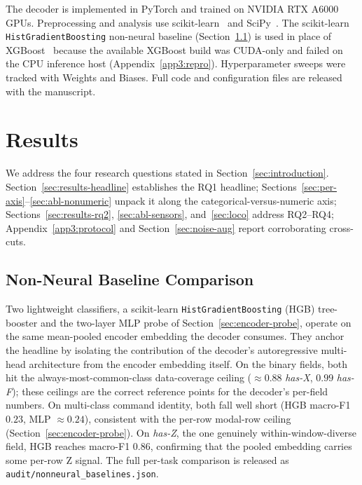\documentclass[sensors,article,submit,moreauthors,pdftex]{Definitions/mdpi}
\begin{document}
The decoder is implemented in PyTorch and trained on NVIDIA RTX A6000 GPUs. Preprocessing and analysis use scikit-learn~\cite{pedregosa2011sklearn} and SciPy~\cite{virtanen2020scipy}. The scikit-learn \texttt{HistGradientBoosting} non-neural baseline (Section~\ref{sec:results-baseline}) is used in place of XGBoost~\cite{chen2016xgboost} because the available XGBoost build was CUDA-only and failed on the CPU inference host (Appendix~\ref{app3:repro}). Hyperparameter sweeps were tracked with Weights and Biases. Full code and configuration files are released with the manuscript.

\section{Results}
\label{sec:experiments}

We address the four research questions stated in Section~\ref{sec:introduction}. Section~\ref{sec:results-headline} establishes the RQ1 headline; Sections~\ref{sec:per-axis}--\ref{sec:abl-nonumeric} unpack it along the categorical-versus-numeric axis; Sections~\ref{sec:results-rq2}, \ref{sec:abl-sensors}, and~\ref{sec:loco} address RQ2--RQ4; Appendix~\ref{app3:protocol} and Section~\ref{sec:noise-aug} report corroborating cross-cuts.

\subsection{Non-Neural Baseline Comparison}
\label{sec:results-baseline}

Two lightweight classifiers, a scikit-learn \texttt{HistGradientBoosting} (HGB) tree-booster and the two-layer MLP probe of Section~\ref{sec:encoder-probe}, operate on the same mean-pooled encoder embedding the decoder consumes. They anchor the headline by isolating the contribution of the decoder's autoregressive multi-head architecture from the encoder embedding itself. On the binary fields, both hit the always-most-common-class data-coverage ceiling ($\approx\!0.88$ \emph{has-X}, $0.99$ \emph{has-F}); these ceilings are the correct reference points for the decoder's per-field numbers. On multi-class command identity, both fall well short (HGB macro-F1 $0.23$, MLP $\approx\!0.24$), consistent with the per-row modal-row ceiling (Section~\ref{sec:encoder-probe}). On \emph{has-Z}, the one genuinely within-window-diverse field, HGB reaches macro-F1 $0.86$, confirming that the pooled embedding carries some per-row Z signal. The full per-task comparison is released as \texttt{audit/nonneural\_baselines.json}.
\end{document}
